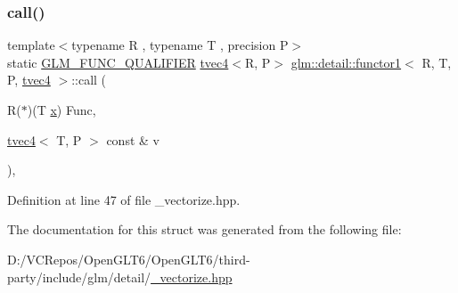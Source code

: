 \subsubsection{\texorpdfstring{call()}{call()}}
{\footnotesize\ttfamily template$<$typename R , typename T , precision P$>$ \\
static \mbox{\hyperlink{setup_8hpp_a33fdea6f91c5f834105f7415e2a64407}{G\+L\+M\+\_\+\+F\+U\+N\+C\+\_\+\+Q\+U\+A\+L\+I\+F\+I\+ER}} \mbox{\hyperlink{structglm_1_1tvec4}{tvec4}}$<$R, P$>$ \mbox{\hyperlink{structglm_1_1detail_1_1functor1}{glm\+::detail\+::functor1}}$<$ R, T, P, \mbox{\hyperlink{structglm_1_1tvec4}{tvec4}} $>$\+::call (\begin{DoxyParamCaption}\item[{R($\ast$)(T \mbox{\hyperlink{glad_8h_a92d0386e5c19fb81ea88c9f99644ab1d}{x}})}]{Func,  }\item[{\mbox{\hyperlink{structglm_1_1tvec4}{tvec4}}$<$ T, P $>$ const \&}]{v }\end{DoxyParamCaption})\hspace{0.3cm}{\ttfamily [inline]}, {\ttfamily [static]}}



Definition at line 47 of file \+\_\+vectorize.\+hpp.



The documentation for this struct was generated from the following file\+:\begin{DoxyCompactItemize}
\item 
D\+:/\+V\+C\+Repos/\+Open\+G\+L\+T6/\+Open\+G\+L\+T6/third-\/party/include/glm/detail/\mbox{\hyperlink{__vectorize_8hpp}{\+\_\+vectorize.\+hpp}}\end{DoxyCompactItemize}
